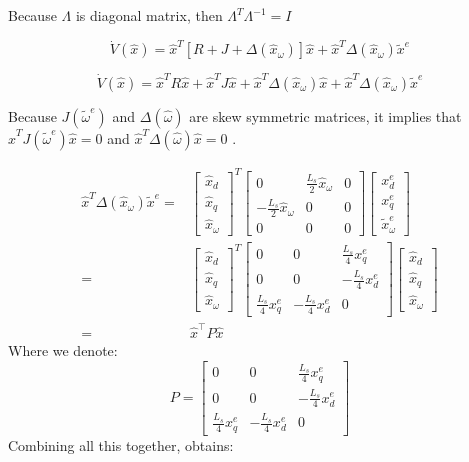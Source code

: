 \documentclass[letterpaper, 10 pt, conference]{ieeeconf}  %
\begin{document}
Because $\Lambda$ is diagonal matrix, then $\Lambda^{T}\Lambda^{-1}=I$

$$
\dot{V}(\hat{x})=\hat{x}^{T}\left[R+J+\Delta(\hat{x}_{\omega})\right]\hat{x}+\hat{x}^{T}\Delta(\hat{x}_{\omega})\tilde{x}^{e}
$$

$$
\dot{V}(\hat{x})=\hat{x}^{T}R\hat{x}+\hat{x}^{T}J\hat{x}+\hat{x}^{T}\Delta(\hat{x}_{\omega})\hat{x}+\hat{x}^{T}\Delta(\hat{x}_{\omega})\tilde{x}^{e}
$$

Because $J(\tilde{\omega}^{e})$ and $\Delta(\hat{\omega})$ are skew
symmetric matrices, it implies that $\hat{x}^{T}J(\tilde{\omega}^{e})\hat{x}=0$
and $\hat{x}^{T}\Delta(\hat{\omega})\hat{x}=0$ .

$$
\begin{aligned}
\hat{x}^{T}\Delta(\hat{x}_{\omega})\tilde{x}^{e}  = &\left[\begin{array}{c}
\hat{x}_{d}\\
\hat{x}_{q}\\
\hat{x}_{\omega}
\end{array}\right]^{T}\left[\begin{array}{ccc}
0 & \frac{L_{s}}{2}\hat{x}_{\omega} & 0\\
-\frac{L_{s}}{2}\hat{x}_{\omega} & 0 & 0\\
0 & 0 & 0
\end{array}\right]\left[\begin{array}{c}
x_{d}^{e}\\
x_{q}^{e}\\
\tilde{x}_{\omega}^{e}
\end{array}\right]\\
  =&  \left[\begin{array}{c}
\hat{x}_{d}\\
\hat{x}_{q}\\
\hat{x}_{\omega}
\end{array}\right]^{T}\left[\begin{array}{ccc}
0 & 0 & \frac{L_{s}}{4}x_{q}^{e}\\
0 & 0 & -\frac{L_{s}}{4}x_{d}^{e}\\
\frac{L_{s}}{4}x_{q}^{e} & -\frac{L_{s}}{4}x_{d}^{e} & 0
\end{array}\right]\left[\begin{array}{c}
\hat{x}_{d}\\
\hat{x}_{q}\\
\hat{x}_{\omega}
\end{array}\right]
\\= & \hat{x}^{\top}P\hat{x}
\end{aligned}
$$
Where we denote:
$$
P=\left[\begin{array}{ccc}
0 & 0 & \frac{L_{s}}{4}x_{q}^{e}\\
0 & 0 & -\frac{L_{s}}{4}x_{d}^{e}\\
\frac{L_{s}}{4}x_{q}^{e} & -\frac{L_{s}}{4}x_{d}^{e} & 0
\end{array}\right]
$$
Combining all this together, obtains: 
\end{document}
